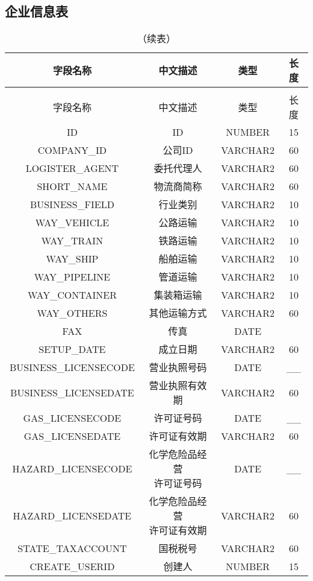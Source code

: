 
\begin{appendices}

\section{企业信息表}

\begin{longtable}{cccc}
    \caption{企业信息表} \label{tab:企业信息表} \\
	\toprule
	字段名称 & 中文描述 & 类型 & 长度 \\
	\midrule
    \endfirsthead %
    \caption{（续表）} \\ %
    \midrule
    字段名称 & 中文描述 & 类型 & 长度 \\
    \midrule
    \endhead %
    \midrule
    \endfoot %
    \bottomrule
    \endlastfoot %
    ID & ID & NUMBER & 15 \\
    COMPANY\_ID & 公司ID & VARCHAR2 & 60 \\
    LOGISTER\_AGENT & 委托代理人 & VARCHAR2 & 60 \\
    SHORT\_NAME & 物流商简称 & VARCHAR2 & 60 \\
    BUSINESS\_FIELD & 行业类别 & VARCHAR2 & 10 \\
    WAY\_VEHICLE & 公路运输 & VARCHAR2 & 10 \\
    WAY\_TRAIN & 铁路运输 & VARCHAR2 & 10 \\
    WAY\_SHIP & 船舶运输 & VARCHAR2 & 10 \\
    WAY\_PIPELINE & 管道运输 & VARCHAR2 & 10 \\
    WAY\_CONTAINER & 集装箱运输 & VARCHAR2 & 10 \\
    WAY\_OTHERS & 其他运输方式 & VARCHAR2 & 60 \\
    FAX & 传真 & DATE & \\
    SETUP\_DATE & 成立日期 & VARCHAR2 & 60 \\
    BUSINESS\_LICENSECODE & 营业执照号码 & DATE & \_\_ \\
    BUSINESS\_LICENSEDATE & 营业执照有效期 & VARCHAR2 & 60 \\
    GAS\_LICENSECODE & 许可证号码 & DATE & \_\_ \\
    GAS\_LICENSEDATE & 许可证有效期 & VARCHAR2 & 60 \\
    HAZARD\_LICENSECODE & \makecell{化学危险品经营 \\ 许可证号码} & DATE & \_\_ \\
    HAZARD\_LICENSEDATE & \makecell{化学危险品经营 \\ 许可证有效期} & VARCHAR2 & 60 \\
    STATE\_TAXACCOUNT & 国税税号 & VARCHAR2 & 60 \\
    CREATE\_USERID & 创建人 & NUMBER & 15
\end{longtable}


\end{appendices}
